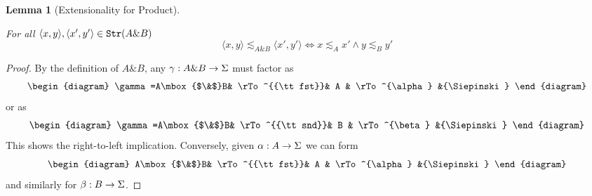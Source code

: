 \documentclass[11pt]{article}
\newtheorem{lemma}[theorem]{Lemma}
\newcommand{\Ip}[1]{\lesssim_{#1}}
\newcommand{\with}{\mbox{$\&$}}
\newcommand{\lang}{\langle}
\newcommand{\rang}{\rangle}
\begin{document}
\begin{lemma}[Extensionality for Product]\label{EfP}

For all $\lang x,y\rang , \lang x',y'\rang \in{\tt Str}(A\with B)$
$$\lang x,y\rang \Ip{A\with B} \lang x',y'\rang  \Longleftrightarrow x\Ip A x' \wedge y\Ip
B y'$$
\end{lemma}
\begin{proof} By the definition of $A\with B$, any $\gamma:A\with
B\rightarrow {\Siepinski}$ must factor as
\[\begin{diagram}
\gamma=A\with B& \rTo^{{\tt fst}}& A & \rTo^{\alpha} &{\Siepinski}
\end{diagram}\]
or as
\[\begin{diagram}
\gamma=A\with B& \rTo^{{\tt snd}}& B & \rTo^{\beta} &{\Siepinski}
\end{diagram}\]
This shows the right-to-left implication. Conversely, given
$\alpha:A\rightarrow {{\Sigma}}$ we can form
\[\begin{diagram}
A\with B& \rTo^{{\tt fst}}& A & \rTo^{\alpha} &{\Siepinski}
\end{diagram}\]
and similarly for $\beta:B\rightarrow{{\Sigma}}$.
\end{proof}
\end{document}
